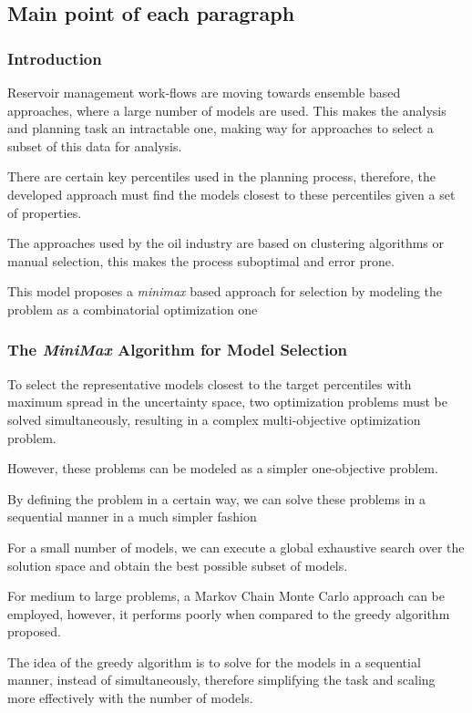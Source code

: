 \documentclass[]{report}
\begin{document}
\subsection{Main point of each paragraph}
\subsubsection{Introduction}
Reservoir management work-flows are moving towards ensemble based approaches, where a large number of models are used. This makes the analysis and planning task an intractable one, making way for approaches to select a subset of this data for analysis.

There are certain key percentiles used in the planning process, therefore, the developed approach must find the models closest to these percentiles given a set of properties.

The approaches used by the oil industry are based on clustering algorithms or manual selection, this makes the process suboptimal and error prone.

This model proposes a \textit{minimax} based approach for selection by modeling the problem as a combinatorial optimization one

\subsubsection{The \textit{MiniMax} Algorithm for Model Selection}
To select the representative models closest to the target percentiles with maximum spread in the uncertainty space, two optimization problems must be solved simultaneously, resulting in a complex multi-objective optimization problem.

However, these problems can be modeled as a simpler one-objective problem.

By defining the problem in a certain way, we can solve these problems in a sequential manner in a much simpler fashion

For a small number of models, we can execute a global exhaustive search over the solution space and obtain the best possible subset of models.

For medium to large problems, a Markov Chain Monte Carlo approach can be employed, however, it performs poorly when compared to the greedy algorithm proposed.

The idea of the greedy algorithm is to solve for the models in a sequential manner, instead of simultaneously, therefore simplifying the task and scaling more effectively with the number of models.
\end{document}
